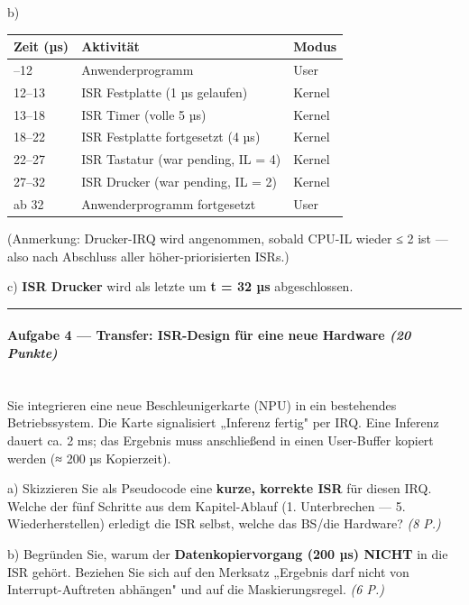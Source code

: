 \documentclass[11pt, a4paper]{article}
\begin{document}
b)



{\small
\begin{tabularx}{\linewidth}{XXX}
\hline
\rowcolor{tableheadbg}
{\color{white}\textbf{Zeit (µs)}} & {\color{white}\textbf{Aktivität}} & {\color{white}\textbf{Modus}} \\[2pt]
\hline
\endhead
\hline
\endfoot
0–12 & Anwenderprogramm & User \\
12–13 & ISR Festplatte (1 µs gelaufen) & Kernel \\
13–18 & ISR Timer (volle 5 µs) & Kernel \\
18–22 & ISR Festplatte fortgesetzt (4 µs) & Kernel \\
22–27 & ISR Tastatur (war pending, IL = 4) & Kernel \\
27–32 & ISR Drucker (war pending, IL = 2) & Kernel \\
ab 32 & Anwenderprogramm fortgesetzt & User \\
\end{tabularx}
}


(Anmerkung: Drucker-IRQ wird angenommen, sobald CPU-IL wieder ≤ 2 ist — also nach Abschluss aller höher-priorisierten ISRs.)


c) \textbf{ISR Drucker} wird als letzte um \textbf{t = 32 µs} abgeschlossen.



\noindent\textcolor{rulegray}{\rule{\linewidth}{0.4pt}}


\paragraph{Aufgabe 4 — Transfer: ISR-Design für eine neue Hardware \textit{(20 Punkte)}}\mbox{}\\[2pt]

Sie integrieren eine neue Beschleunigerkarte (NPU) in ein bestehendes Betriebssystem. Die Karte signalisiert „Inferenz fertig" per IRQ. Eine Inferenz dauert ca. 2 ms; das Ergebnis muss anschließend in einen User-Buffer kopiert werden (≈ 200 µs Kopierzeit).


a) Skizzieren Sie als Pseudocode eine \textbf{kurze, korrekte ISR} für diesen IRQ. Welche der fünf Schritte aus dem Kapitel-Ablauf (1. Unterbrechen — 5. Wiederherstellen) erledigt die ISR selbst, welche das BS/die Hardware? \textit{(8 P.)}


b) Begründen Sie, warum der \textbf{Datenkopiervorgang (200 µs) NICHT} in die ISR gehört. Beziehen Sie sich auf den Merksatz „Ergebnis darf nicht von Interrupt-Auftreten abhängen" und auf die Maskierungsregel. \textit{(6 P.)}
\end{document}
